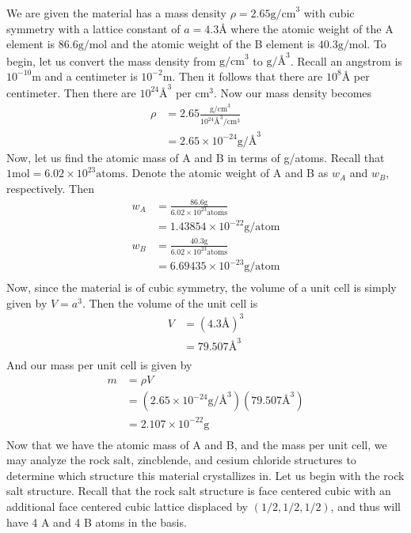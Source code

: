 \documentclass{article}
\begin{document}
We are given the material has a mass density $\rho = 2.65 \text{g/cm}^3$ with cubic symmetry with a lattice constant of $a = 4.3 \text{\AA}$ where the atomic weight of the A element is $86.6 \text{g/mol}$ and the atomic weight of the B element is $40.3 \text{g/mol}$. To begin, let us convert the mass density from $\text{g/cm}^3$ to $\text{g/\AA}^3$. Recall an angstrom is $10^{-10} \text{m}$ and a centimeter is $10^{-2} \text{m}$. Then it follows that there are $10^8 \text{\AA}$ per centimeter. Then there are $10^{24} \text{\AA}^3$ per $\text{cm}^3$. Now our mass density becomes
\begin{align*}
    \rho &= 2.65 \frac{\text{g/cm}^3}{10^{24} \text{\AA}^3/\text{cm}^3} \\
    &= 2.65 \times 10^{-24} \text{g/\AA}^3
\end{align*}
Now, let us find the atomic mass of A and B in terms of g/atoms. Recall that $1 \text{mol} = 6.02 \times 10^{23} \text{atoms}$. Denote the atomic weight of A and B as $w_A$ and $w_B$, respectively. Then
\begin{align*}
    w_A &= \frac{86.6 \text{g}}{6.02\times 10^{23} \text{atoms}} \\
    &= 1.43854\times 10^{-22} \text{g/atom} \\
    w_B &= \frac{40.3 \text{g}}{6.02 \times 10^{23} \text{atoms}} \\
    &= 6.69435 \times 10^{-23} \text{g/atom} \\
\end{align*}
Now, since the material is of cubic symmetry, the volume of a unit cell is simply given by $V = a^3$. Then the volume of the unit cell is
\begin{align*}
    V &= (4.3 \text{\AA})^3 \\
    &= 79.507 \text{\AA}^3 \\
\end{align*}
And our mass per unit cell is given by
\begin{align*}
    m &= \rho V \\
    &= (2.65 \times 10^{-24} \text{g/\AA}^3)(79.507 \text{\AA}^3) \\
    &= 2.107 \times 10^{-22} \text{g} \\
\end{align*}
Now that we have the atomic mass of A and B, and the mass per unit cell, we may analyze the rock salt, zincblende, and cesium chloride structures to determine which structure this material crystallizes in. 
Let us begin with the rock salt structure. Recall that the rock salt structure is face centered cubic with an additional face centered cubic lattice displaced by $(1/2,1/2,1/2)$, and thus will have 4 A and 4 B atoms in the basis. 
\end{document}
